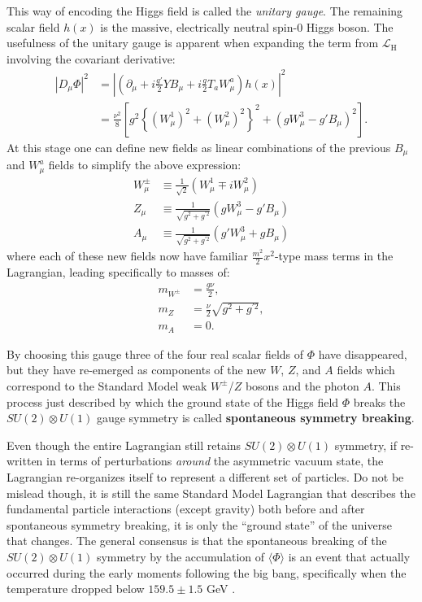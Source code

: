 This way of encoding the Higgs field is called the \textit{unitary gauge}.
The remaining scalar field $h(x)$ is the massive, electrically neutral spin-0 Higgs boson. %
The usefulness of the unitary gauge is apparent when expanding the term from $\mathcal{L}_{\mathrm{H}}$ involving the covariant derivative:
\begin{align}
    \left|D_\mu \Phi\right|^2 &= \left| \left( \partial_\mu + i \frac{g'}{2} Y B_\mu + i \frac{g}{2} T_a W_\mu^a \right) h(x) \right|^2 \\
    &= \frac{\nu^2}{8} \left[
     g^2 \left\{ (W^1_\mu)^2 + (W_\mu^2)^2 \right\}^2 + (gW^3_\mu - g' B_\mu)^2
    \right].
\end{align}
At this stage one can define new fields as linear combinations of the previous $B_\mu$ and $W^a_\mu$ fields to simplify the above expression:
\begin{align}
    W_\mu^\pm &\equiv \frac{1}{\sqrt{2}} \left( W^1_\mu \mp i W^2_\mu \right) \\
    Z_\mu &\equiv \frac{1}{\sqrt{g^2 + g^{\prime 2}}} \left( g W^3_\mu - g' B_\mu \right) \\
    A_\mu &\equiv \frac{1}{\sqrt{g^2 + g^{\prime 2}}} \left( g' W^3_\mu + g B_\mu \right)
\end{align}
where each of these new fields now have familiar $\frac{m^2}{2}x^2$-type mass terms in the Lagrangian, leading specifically to masses of:
\begin{align}
    m_{W^\pm} &= \frac{g\nu}{2}, \\
    m_{Z} &= \frac{\nu}{2}\sqrt{g^2 + g^{\prime 2}}, \\
    m_{A} &= 0.
\end{align}

By choosing this gauge three of the four real scalar fields of $\Phi$ have disappeared, but they have re-emerged as components of the new $W$, $Z$, and $A$ fields which correspond to the Standard Model weak $W^\pm$/$Z$ bosons and the photon $A$.
This process just described by which the ground state of the Higgs field $\Phi$ breaks the $SU(2) \otimes U(1)$ gauge symmetry is called \textbf{spontaneous symmetry breaking}.

Even though the entire Lagrangian still retains $SU(2) \otimes U(1)$ symmetry, if re-written in terms of perturbations \textit{around} the asymmetric vacuum state, the Lagrangian re-organizes itself to represent a different set of particles.
Do not be mislead though, it is still the same Standard Model Lagrangian that describes the fundamental particle interactions (except gravity) both before and after spontaneous symmetry breaking, it is only the ``ground state'' of the universe that changes.
The general consensus is that the spontaneous breaking of the $SU(2) \otimes U(1)$ symmetry by the accumulation of $\langle \Phi \rangle$ is an event that actually occurred during the early moments following the big bang, specifically when the temperature dropped below $159.5 \pm 1.5$ GeV \cite{DOnofrio:2015gop}.

